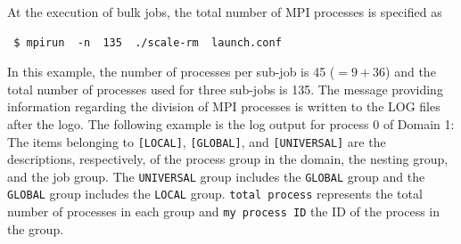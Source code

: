 
At the execution of bulk jobs, the total number of MPI processes is specified as

\begin{verbatim}
 $ mpirun  -n  135  ./scale-rm  launch.conf
\end{verbatim}
In this example, the number of processes per sub-job is 45 ($=9 + 36$) and the total number of processes used for three sub-jobs is 135. The message providing information regarding the division of MPI processes is written to the LOG files after the \scalelib logo. The following example is the log output for process 0 of Domain 1:
The items belonging to \verb|[LOCAL]|, \verb|[GLOBAL]|, and \verb|[UNIVERSAL]| are the descriptions, respectively, of the process group in the domain, the nesting group, and the job group. The \verb|UNIVERSAL| group includes the \verb|GLOBAL| group and the \verb|GLOBAL| group includes the \verb|LOCAL| group. \verb|total process| represents the total number  of processes in each group and \verb|my process ID| the ID of the process in the group.

